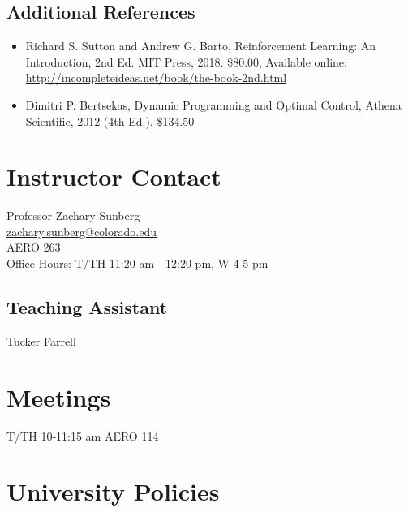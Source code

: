 \documentclass[9pt]{article}
\begin{document}
\subsection*{Additional References}

\begin{itemize}[noitemsep]
    \item Richard S. Sutton and Andrew G. Barto, Reinforcement Learning: An Introduction, 2nd Ed. MIT Press, 2018. \$80.00, Available online: \url{http://incompleteideas.net/book/the-book-2nd.html}
    \item Dimitri P. Bertsekas, Dynamic Programming and Optimal Control, Athena Scientific, 2012 (4th Ed.). \$134.50
\end{itemize}

\vspace{12pt}
\begin{multicols}{2}
    \begin{minipage}{\columnwidth}
\section*{Instructor Contact}

Professor Zachary Sunberg\\
\href{mailto://zachary.sunberg@colorado.edu}{zachary.sunberg@colorado.edu}\\
AERO 263\\
Office Hours: T/TH 11:20 am - 12:20 pm, W 4-5 pm

\subsection*{Teaching Assistant}

Tucker Farrell
    \end{minipage}

\section*{Meetings}

T/TH 10-11:15 am AERO 114
\end{multicols}

\section*{University Policies}
\end{document}
